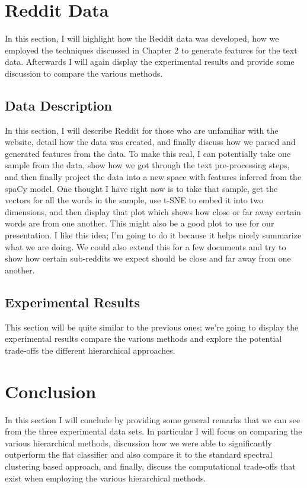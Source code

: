 \documentclass[../thesis.tex]{subfiles}
\begin{document}
\section{Reddit Data}
In this section, I will highlight how the Reddit data was developed, how we employed the techniques discussed in Chapter 2 to generate features for the text data. Afterwards I will again display the experimental results and provide some discussion to compare the various methods.

\subsection{Data Description}
In this section, I will describe Reddit for those who are unfamiliar with the website, detail how the data was created, and finally discuss how we parsed and generated features from the data. To make this real, I can potentially take one sample from the data, show how we got through the text pre-processing steps, and then finally project the data into a new space with features inferred from the spaCy model. One thought I have right now is to take that sample, get the vectors for all the words in the sample, use t-SNE to embed it into two dimensions, and then display that plot which shows how close or far away certain words are from one another. This might also be a good plot to use for our presentation. I like this idea; I'm going to do it because it helps nicely summarize what we are doing. We could also extend this for a few documents and try to show how certain sub-reddits we expect should be close and far away from one another. 

\subsection{Experimental Results}
This section will be quite similar to the previous ones; we're going to display the experimental results compare the various methods and explore the potential trade-offs the different hierarchical approaches.

\section{Conclusion}
In this section I will conclude by providing some general remarks that we can see from the three experimental data sets. In particular I will focus on comparing the various hierarchical methods, discussion how we were able to significantly outperform the flat classifier and also compare it to the standard spectral clustering based approach, and finally, discuss the computational trade-offs that exist when employing the various hierarchical methods. 
\end{document}

